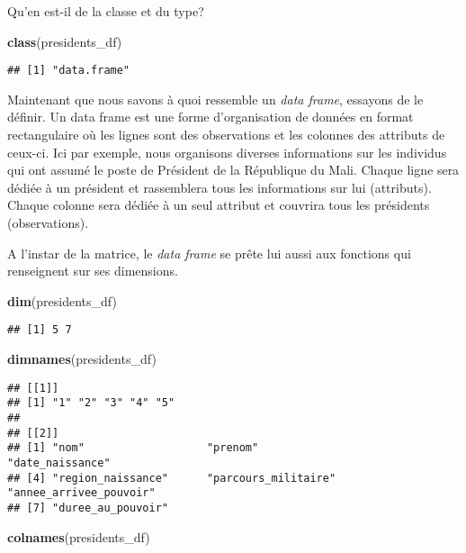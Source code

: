 \documentclass[]{book}
\newenvironment{Shaded}{\begin{snugshade}}{\end{snugshade}}
\newcommand{\KeywordTok}[1]{\textcolor[rgb]{0.13,0.29,0.53}{\textbf{#1}}}
\newcommand{\NormalTok}[1]{#1}
\begin{document}
Qu'en est-il de la classe et du type?

\begin{Shaded}
\begin{Highlighting}[]
\KeywordTok{class}\NormalTok{(presidents_df)}
\end{Highlighting}
\end{Shaded}

\begin{verbatim}
## [1] "data.frame"
\end{verbatim}

Maintenant que nous savons à quoi ressemble un \emph{data frame},
essayons de le définir. Un data frame est une forme d'organisation de
données en format rectangulaire où les lignes sont des observations et
les colonnes des attributs de ceux-ci. Ici par exemple, nous organisons
diverses informations sur les individus qui ont assumé le poste de
Président de la République du Mali. Chaque ligne sera dédiée à un
président et rassemblera tous les informations sur lui (attributs).
Chaque colonne sera dédiée à un seul attribut et couvrira tous les
présidents (observations).

A l'instar de la matrice, le \emph{data frame} se prête lui aussi aux
fonctions qui renseignent sur ses dimensions.

\begin{Shaded}
\begin{Highlighting}[]
\KeywordTok{dim}\NormalTok{(presidents_df)}
\end{Highlighting}
\end{Shaded}

\begin{verbatim}
## [1] 5 7
\end{verbatim}

\begin{Shaded}
\begin{Highlighting}[]
\KeywordTok{dimnames}\NormalTok{(presidents_df)}
\end{Highlighting}
\end{Shaded}

\begin{verbatim}
## [[1]]
## [1] "1" "2" "3" "4" "5"
## 
## [[2]]
## [1] "nom"                   "prenom"                "date_naissance"       
## [4] "region_naissance"      "parcours_militaire"    "annee_arrivee_pouvoir"
## [7] "duree_au_pouvoir"
\end{verbatim}

\begin{Shaded}
\begin{Highlighting}[]
\KeywordTok{colnames}\NormalTok{(presidents_df)}
\end{Highlighting}
\end{Shaded}
\end{document}
